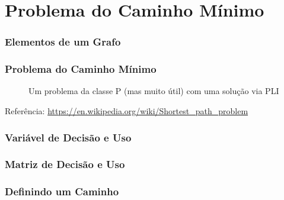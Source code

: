 \documentclass{beamer}
\begin{document}
\section{Problema do Caminho Mínimo}

\begin{frame}
    \frametitle{Elementos de um Grafo}
    
    \begin{figure}[tbp]
    \centering
    \end{figure}


\end{frame}
\begin{frame}
	\frametitle{Problema do Caminho Mínimo}
	
	\begin{figure}[tbp]
		\centering
		\caption{Um problema da classe P (mas muito útil) com uma solução via PLI}
	\end{figure}
Referência: \url{https://en.wikipedia.org/wiki/Shortest_path_problem}
\end{frame}


\begin{frame}
	\frametitle{Variável de Decisão e Uso}
	
	\begin{figure}[tbp]
		\centering
	\end{figure}
\end{frame}
\begin{frame}
	\frametitle{Matriz de Decisão e Uso}
	
	\begin{figure}[tbp]
		\centering
	\end{figure}
\end{frame}

\begin{frame}
	\frametitle{Definindo um Caminho}
	
	\begin{figure}[tbp]
		\centering
	\end{figure}
\end{frame}
\end{document}

